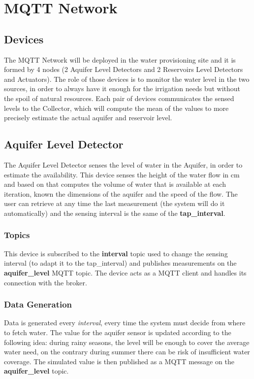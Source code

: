 \section{MQTT Network}

\subsection{Devices}
The MQTT Network will be deployed in the water provisioning site and it is formed by 4 nodes (2 Aquifer Level Detectors and 2 Reservoirs Level Detectors and Actuators). The role of those devices is to monitor the water level in the two sources, in order to always have it enough for the irrigation needs but without the spoil of natural resources. Each pair of devices communicates the sensed levels  to the Collector, which will compute the mean of the values to more precisely estimate the actual aquifer and reservoir level.


\subsection{Aquifer Level Detector}
The Aquifer Level Detector senses the level of water in the Aquifer, in order to estimate the availability. This device senses the height of the water flow in cm and based on that computes the volume of water that is available at each iteration, known the dimensions of the aquifer and the speed of the flow. The user can retrieve at any time the last measurement (the system will do it automatically) and the sensing interval is the same of the \textbf{tap\_interval}.

\subsubsection{Topics}
This device is subscribed to the \textbf{interval} topic used to change the sensing interval (to adapt it to the tap\_interval) and publishes measurements on the \textbf{aquifer\_level} MQTT topic.
The device acts as a MQTT client and handles its connection with the broker.

\subsubsection{Data Generation}
Data is generated every \textit{interval}, every time the system must decide from where to fetch water. The value for the aquifer sensor is updated according to the following idea: during rainy seasons, the level will be enough to cover the average water need, on the contrary during summer there can be risk of insufficient water coverage. The simulated value is then published as a MQTT message on the \textbf{aquifer\_level} topic.

